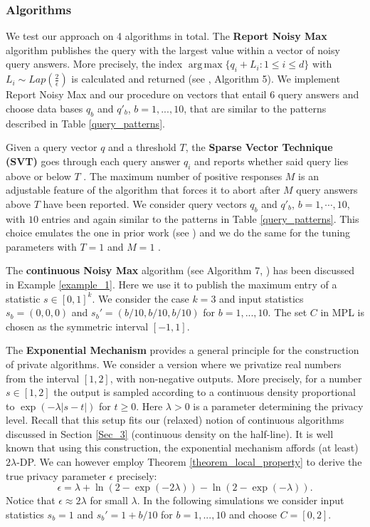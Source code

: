\documentclass[conference]{IEEEtran}
\DeclareMathOperator*{\argmax}{arg\,max}
\begin{document}
\subsubsection*{\textbf{Algorithms}} 
We test our approach on 4 algorithms in total. The \textbf{Report Noisy Max} algorithm \cite{Dwork2014} publishes the query with the largest value within a vector of noisy query answers. More precisely, the index $\argmax \{ q_i + L_i : 1 \leq i \leq d \}$ with $L_i \sim Lap( \frac{2}{\epsilon})$ is calculated and returned (see \cite{StatDP}, Algorithm 5). We implement Report Noisy Max and our procedure on vectors that entail 6 query answers and choose data bases $q_b$ and $q'_b$, $b = 1, ..., 10$, that are similar to the patterns described in Table \ref{query_patterns}.

Given a query vector $q$ and a threshold $T$, the \textbf{Sparse Vector Technique (SVT)} goes through each query answer $q_i$ and reports whether said query lies above or below $T$ \cite{Dwork2014}. The maximum number of positive responses $M$ is an adjustable feature of the algorithm that forces it to abort after $M$ query answers above $T$ have been reported. We consider query vectors $q_b$ and $q'_b$, $b = 1, \cdots, 10$, with $10$ entries and again similar to the patterns in Table \ref{query_patterns}. This choice emulates the one in prior work (see \cite{StatDP, DP-Sniper}) and we do the same for the tuning parameters with $T=1$ and $M = 1$ \cite{DP-Sniper}.

The \textbf{continuous Noisy Max} algorithm (see Algorithm 7,  \cite{StatDP}) has been discussed in Example \ref{example_1}. Here we use it to publish the maximum entry of a statistic $s \in [0,1]^k$. We consider the case $k=3$ and input statistics $s_b = (0,0,0)$ and $s_b'=(b/10,b/10,b/10)$ for $b=1,...,10$. The set $C$ in MPL is chosen as the symmetric interval $[-1,1]$.

The \textbf{Exponential Mechanism} provides a general principle for the construction of private algorithms. We consider a version where we privatize real numbers from the interval $[1,2]$, with non-negative outputs. More precisely, for a number $s \in [1,2]$ the output is sampled according to a continuous density proportional to $\exp(-\lambda |s-t|)$ for $t\ge 0$. Here $\lambda>0$ is a parameter determining the privacy level. Recall that this setup fits our (relaxed) notion of continuous algorithms discussed in Section \ref{Sec_3} (continuous density on the half-line). It is well known that using this construction, the exponential mechanism affords (at least) $2\lambda$-DP. We can however employ Theorem \ref{theorem_local_property} to derive the true privacy parameter $\epsilon$ precisely:
$$
\epsilon = \lambda + \ln(2-\exp(-2\lambda))-\ln(2-\exp(-\lambda)).
$$
Notice that $\epsilon \approx 2\lambda$ for small $\lambda$. In the following simulations we consider input statistics $s_b = 1$ and $s_b'=1+b/10$ for $b=1,...,10$ and choose $C = [0,2]$.
\end{document}
